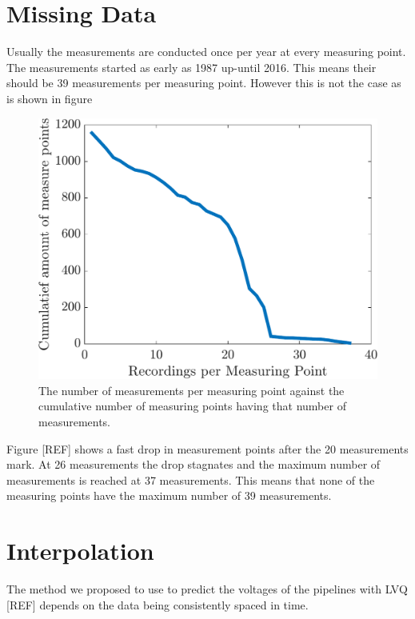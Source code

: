 
\section{Missing Data}
\label{sec:dataset:missing-data}
Usually the measurements are conducted once per year at every measuring point. The measurements started as early as 1987 up-until 2016. This means their should be 39 measurements per measuring point. However this is not the case as is shown in figure  %

\begin{figure}[!htb]
\centering
\includegraphics[width=.75\textwidth]{./gfx/chapters/data/cumulatief-recordings-per-measurepoint.pdf}
\caption{The number of measurements per measuring point against the cumulative number of measuring points having that number of measurements.}
\label{fig:dataset:cumulatief-recordings}
\end{figure}

Figure [REF] shows a fast drop in measurement points after the 20 measurements mark. At 26 measurements the drop stagnates and the maximum number of measurements is reached at 37 measurements. This means that none of the measuring points have the maximum number of 39 measurements.



\section{Interpolation}
\label{sec:dataset:interpolation}
The method we proposed to use to predict the voltages of the pipelines with LVQ [REF] depends on the data being consistently spaced in time. 


